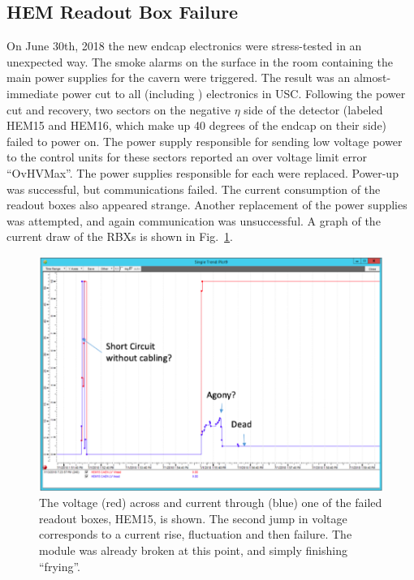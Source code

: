 \subsection{HEM Readout Box Failure}
On June 30th, 2018 the new endcap electronics were stress-tested in an unexpected way. The smoke alarms on the surface in the room containing the main power supplies for the cavern were triggered. The result was an almost-immediate power cut to all \CMS (including \HCAL) electronics in USC. Following the power cut and recovery, two sectors on the negative \ensuremath{\eta} side of the detector (labeled HEM15 and HEM16, which make up 40 degrees of the endcap on their side) failed to power on. The power supply responsible for sending low voltage power to the control units for these sectors reported an over voltage limit error ``OvHVMax''. The power supplies responsible for each were replaced.  Power-up was successful, but communications failed. The current consumption of the readout boxes also appeared strange. Another replacement of the power supplies was attempted, and again communication was unsuccessful. A graph of the current draw of the RBXs is shown in Fig.~\ref{fig:dyingRBX}.

\begin{figure}[!tp]
    \centering
    \includegraphics[width=\textwidth]{figures/DYINGRBX.png}
    \caption[
       Failure of HEM15 RBX.
    ]{
        The voltage (red) across and current through (blue) one of the failed readout boxes, HEM15, is shown. The second jump in voltage corresponds to a current rise, fluctuation and then failure. The module was already broken at this point, and simply finishing ``frying''.  
    }
    \label{fig:dyingRBX}
\end{figure}

